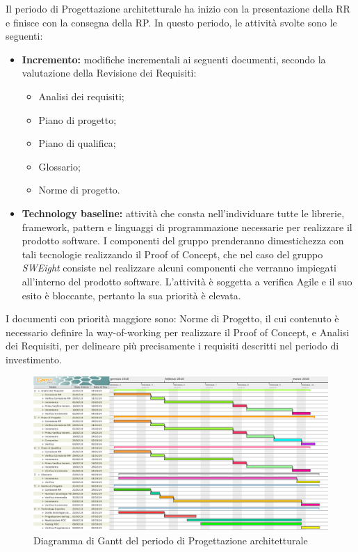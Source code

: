 Il periodo di Progettazione architetturale ha inizio con la presentazione della RR e finisce con la consegna della RP.\newline
In questo periodo, le attività svolte sono le seguenti:
\begin{itemize}
	\item \textbf{Incremento:} modifiche incrementali ai seguenti documenti, secondo la valutazione della Revisione dei Requisiti:
	\begin{itemize}
		\item Analisi dei requisiti;
		\item Piano di progetto;
		\item Piano di qualifica;
		\item Glossario;
		\item Norme di progetto.
	\end{itemize}
	\item \textbf{Technology baseline:} attività che consta nell'individuare tutte le librerie, framework, pattern e linguaggi di programmazione necessarie per realizzare il prodotto software. I componenti del gruppo prenderanno dimestichezza con tali tecnologie realizzando il Proof of Concept, che nel caso del gruppo \textit{SWEight} consiste nel realizzare alcuni componenti che verranno impiegati all'interno del prodotto software. L'attività è soggetta a verifica {Agile} e il suo esito è bloccante, pertanto la sua priorità è elevata. 
\end{itemize}
I documenti con priorità maggiore sono: Norme di Progetto, il cui contenuto è necessario definire la {way-of-working} per realizzare il {Proof of Concept}, e Analisi dei Requisiti, per delineare più precisamente i requisiti descritti nel periodo di investimento.
\begin{figure}[H]
	\begin{center}
		\includegraphics[width=17cm,height=\textheight,keepaspectratio]{Pianificazione/Progettazione.pdf}
	\caption{Diagramma di Gantt del periodo di Progettazione architetturale}
	\end{center}
\end{figure}
